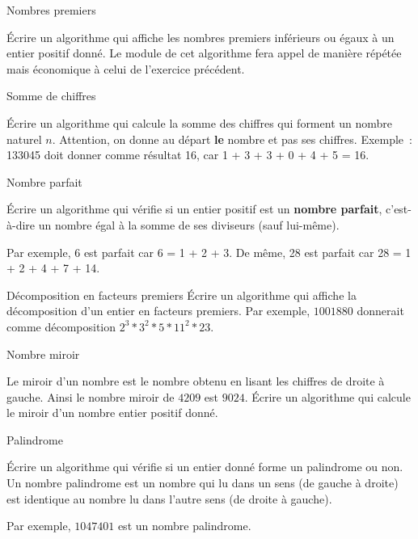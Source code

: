 	\begin{Exercice}{Nombres premiers}

		Écrire un algorithme qui affiche les nombres premiers inférieurs ou
		égaux à un entier positif donné. Le module de cet algorithme fera appel
		de manière répétée mais économique à celui de l’exercice précédent.
	\end{Exercice}

	\begin{Exercice}{Somme de chiffres}

		Écrire un algorithme qui calcule la somme des chiffres qui forment un
		nombre naturel $n$. Attention, on donne au départ \textbf{le} nombre et
		pas ses chiffres. Exemple~: 133045 doit donner comme résultat 16,
		car 1 + 3 + 3 + 0 + 4 + 5 = 16.
	\end{Exercice}

	\begin{Exercice}{Nombre parfait}

		Écrire un algorithme qui vérifie si un entier positif est un
		\textbf{nombre parfait}, c’est-à-dire un nombre égal à la somme de ses
		diviseurs (sauf lui-même). 

		Par exemple, 6 est parfait car 6 = 1 + 2 + 3. 
		De même, 28 est parfait car 28 = 1 + 2 + 4 + 7 + 14.
	\end{Exercice}

	\begin{Exercice}{Décomposition en facteurs premiers}
		Écrire un algorithme qui affiche la décomposition 
		d’un entier en facteurs premiers. 
		Par exemple, $1001880$ donnerait comme décomposition
		$2^3 * 3^2 * 5 * 11^2 * 23$.
	\end{Exercice}

	\begin{Exercice}{Nombre miroir}

		Le miroir d’un nombre est le nombre obtenu
		en lisant les chiffres de droite à gauche.
		Ainsi le nombre miroir de $4209$ est $9024$.
		Écrire un algorithme qui calcule le miroir
		d’un nombre entier positif donné.
	\end{Exercice}

	\begin{Exercice}{Palindrome}

		Écrire un algorithme qui vérifie si un entier donné 
		forme un palindrome ou non. 
		Un nombre palindrome est un nombre qui lu dans un sens 
		(de gauche à droite) est identique au nombre lu dans l’autre sens 
		(de droite à gauche). 
		
		Par exemple, $1047401$ est un nombre palindrome.
	\end{Exercice}

